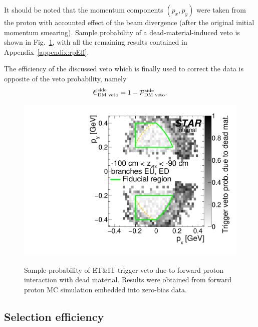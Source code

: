 It should be noted that the momentum components $(p_{x}, p_{y})$ were taken from the proton with accounted effect of the beam divergence (after the original initial momentum smearing). Sample probability of a dead-material-induced veto is shown in Fig.~\ref{fig:sampleRpDeadMatVeto}, with all the remaining results contained in Appendix~\ref{appendix:rpEff}.

The efficiency of the discussed veto which is finally used to correct the data is opposite of the veto probability, namely
\begin{equation}
 \mbox{\LARGE$\epsilon$}_{\text{DM~veto}}^{\text{side}} = 1 - \mathcal{P}_{\text{DM~veto}}^{\text{side}}.
\end{equation}


\begin{figure}[ht!]
\centering%
\parbox{0.4725\textwidth}{%
  \centering%
  \includegraphics[width=\linewidth,page=3]{graphics/corrections/mcDeadMatProbPxPy.pdf}\label{fig:sampleDeadMatVetoProb}
}%
\quad%
\parbox{0.4725\textwidth}{%
    \caption[Sample probability of ET\&IT trigger veto due to forward proton interaction with dead material.]{Sample probability of ET\&IT trigger veto due to forward proton interaction with dead material. Results were obtained from forward proton MC simulation embedded into zero-bias data.}\label{fig:sampleRpDeadMatVeto}%
}
\end{figure}





\subsection{Selection efficiency}\label{sec:cutsEff}
